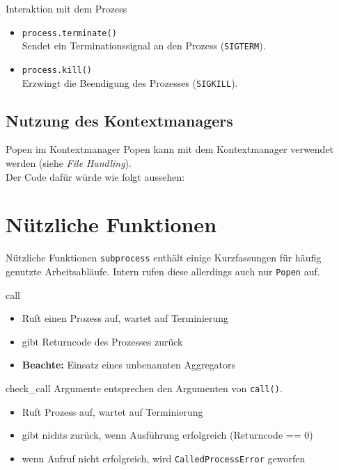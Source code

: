 \begin{frame}[fragile]{Interaktion mit dem Prozess}
	\begin{itemize}
		\item \texttt{process.terminate()} \\
			Sendet ein Terminationssignal an den Prozess (\texttt{SIGTERM}).
		\item \texttt{process.kill()} \\
			Erzwingt die Beendigung des Prozesses (\texttt{SIGKILL}).
	\end{itemize}
\end{frame}

\subsection{Nutzung des Kontextmanagers}
\begin{frame}{Popen im Kontextmanager}
	Popen kann mit dem Kontextmanager verwendet werden (siehe \textit{File Handling}). \\
	Der Code daf\"ur w\"urde wie folgt aussehen:
	
\end{frame}

\section{N\"utzliche Funktionen}
\begin{frame}[fragile]{N\"utzliche Funktionen}
	\texttt{subprocess} enth\"alt einige Kurzfassungen f\"ur h\"aufig genutzte Arbeitsabl\"aufe.
	Intern rufen diese allerdings auch nur \texttt{Popen} auf.
\end{frame}

\begin{frame}{call}
	
	\begin{itemize}
		\item Ruft einen Prozess auf, wartet auf Terminierung
		\item gibt Returncode des Prozesses zur\"uck
		\item \textbf{Beachte:} Einsatz eines unbenannten Aggregators
	\end{itemize}
\end{frame}

\begin{frame}[fragile]{check\_call}
	Argumente entsprechen den Argumenten von \texttt{call()}.
	\begin{itemize}
		\item Ruft Prozess auf, wartet auf Terminierung
		\item gibt nichts zur\"uck, wenn Ausf\"uhrung erfolgreich (Returncode == 0)
		\item wenn Aufruf nicht erfolgreich, wird \texttt{CalledProcessError} geworfen
	\end{itemize}
\end{frame}

